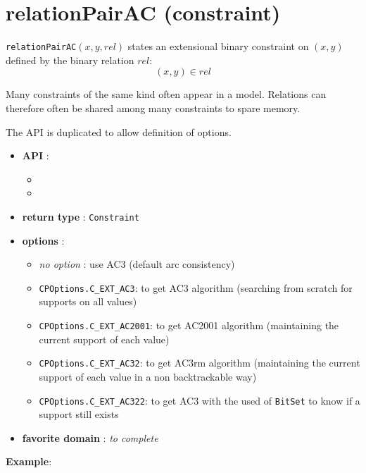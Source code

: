 \label{relationpairac}
\hypertarget{relationpairac}{}

\section{relationPairAC (constraint)}\label{relationpairac:relationpairacconstraint}\hypertarget{relationpairac:relationpairacconstraint}{}
\begin{notedef}
  \texttt{relationPairAC}$(x,y,rel)$ states an extensional binary constraint on $(x,y)$ defined by the binary relation $rel$:
$$(x,y)\in rel$$
\end{notedef}
Many constraints of the same kind often appear in a model. Relations can therefore often be shared among many constraints to spare memory.

The API is duplicated to allow definition of options.

\begin{itemize}
	\item \textbf{API} :
	\begin{itemize}
		\item {}
		\item {}
	\end{itemize}
	\item \textbf{return type} : \texttt{Constraint}
	\item \textbf{options} :
	\begin{itemize}
		\item \emph{no option} : use AC3 (default arc consistency)
		\item \texttt{CPOptions.C_EXT_AC3}: to get AC3 algorithm (searching from scratch for supports on all values)
		\item \texttt{CPOptions.C_EXT_AC2001}: to get AC2001 algorithm (maintaining the current support of each value)
		\item \texttt{CPOptions.C_EXT_AC32}: to get AC3rm algorithm (maintaining the current support of each value in a non backtrackable way)
		\item \texttt{CPOptions.C_EXT_AC322}: to get AC3 with the used of \texttt{BitSet} to know if a support still exists
	\end{itemize}
	\item \textbf{favorite domain} : \emph{to complete}
\end{itemize}

\textbf{Example}:



